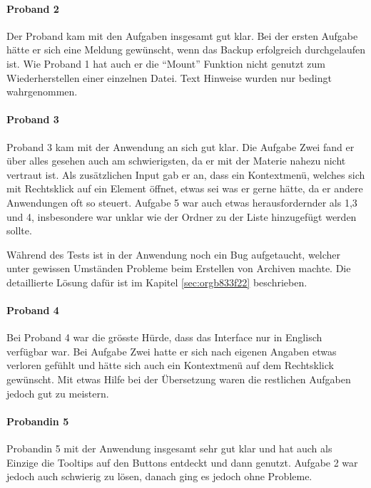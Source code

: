 \paragraph{Proband 2}
\label{sec:org781eba2}

Der Proband kam mit den Aufgaben insgesamt gut klar. Bei der ersten Aufgabe
hätte er sich eine Meldung gewünscht, wenn das Backup erfolgreich durchgelaufen
ist. Wie Proband 1 hat auch er die "`Mount"' Funktion nicht genutzt zum
Wiederherstellen einer einzelnen Datei. Text Hinweise wurden nur bedingt
wahrgenommen.

\paragraph{Proband 3}
\label{sec:org5e96fb4}

Proband 3 kam mit der Anwendung an sich gut klar. Die Aufgabe Zwei fand er über
alles gesehen auch am schwierigsten, da er mit der Materie nahezu nicht vertraut
ist. Als zusätzlichen Input gab er an, dass ein Kontextmenü, welches sich mit
Rechtsklick auf ein Element öffnet, etwas sei was er gerne hätte, da er andere
Anwendungen oft so steuert. Aufgabe 5 war auch etwas herausfordernder als 1,3
und 4, insbesondere war unklar wie der Ordner zu der Liste hinzugefügt werden
sollte.

Während des Tests ist in der Anwendung noch ein Bug aufgetaucht, welcher unter
gewissen Umständen Probleme beim Erstellen von Archiven machte. Die
detaillierte Lösung dafür ist im Kapitel \ref{sec:orgb833f22} beschrieben.

\paragraph{Proband 4}
\label{sec:org1ab4440}

Bei Proband 4 war die grösste Hürde, dass das Interface nur in Englisch
verfügbar war. Bei Aufgabe Zwei hatte er sich nach eigenen Angaben etwas verloren
gefühlt und hätte sich auch ein Kontextmenü auf dem Rechtsklick gewünscht.
Mit etwas Hilfe bei der Übersetzung waren die restlichen Aufgaben jedoch gut zu
meistern.

\paragraph{Probandin 5}
\label{sec:org07165e5}

Probandin 5 mit der Anwendung insgesamt sehr gut klar und hat auch als Einzige
die Tooltips auf den Buttons entdeckt und dann genutzt. Aufgabe 2 war jedoch
auch schwierig zu lösen, danach ging es jedoch ohne Probleme.

